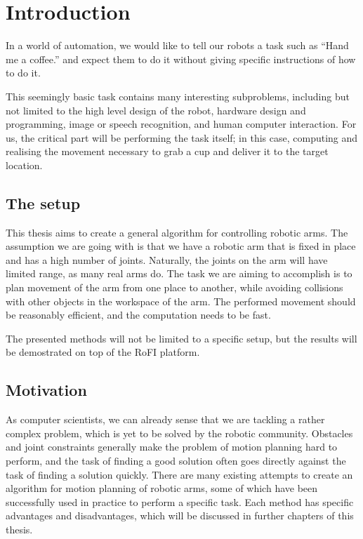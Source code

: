\chapter{Introduction}


In a world of automation, we would like to tell our robots a task such
as \enquote{Hand me a coffee.} and expect them to do it without giving
specific instructions of how to do it.

This seemingly basic task contains many interesting subproblems, including but not limited to
the high level design of the robot, hardware design and programming, image or speech recognition, and human computer interaction.
For us, the critical part will be performing the task itself; in this case, computing and realising the movement necessary to grab a cup and deliver it to the target location.

\section{The setup}

This thesis aims to create a general algorithm for controlling robotic arms.
The assumption we are going with is that we have a robotic arm that is fixed in place and has a high number of joints.
Naturally, the joints on the arm will have limited range, as many real arms do.
The task we are aiming to accomplish is to plan movement of the arm from one place to another, while avoiding collisions with other objects in the workspace of the arm.
The performed movement should be reasonably efficient, and the computation needs to be fast.

The presented methods will not be limited to a specific setup, but the results will be demostrated on top of the RoFI platform\cite{rofiPlatform}.

\section{Motivation}

As computer scientists, we can already sense that we are tackling a rather complex problem, which is yet to be solved by the robotic community. Obstacles and joint constraints generally make the problem of motion planning hard to perform, and the task of finding a good solution often goes directly against the task of finding a solution quickly.
There are many existing attempts to create an algorithm for motion planning of robotic arms,
some of which have been successfully used in practice to perform a specific task. Each method has specific advantages and disadvantages, which will be discussed in further chapters of this thesis.

